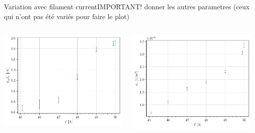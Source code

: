 \documentclass[10pt]{beamer}
\begin{document}
\begin{frame}{Variation avec filament current}{IMPORTANT! donner les autres parametres (ceux qui n'ont pas été variés pour faire le plot)}
    \begin{columns}
        \centering
        \includegraphics[scale=1]{../figures/temperatureeV_current.pdf}


        \centering
        \includegraphics[scale=1]{../figures/density_current.pdf}

    \end{columns}
\end{frame}
\end{document}
